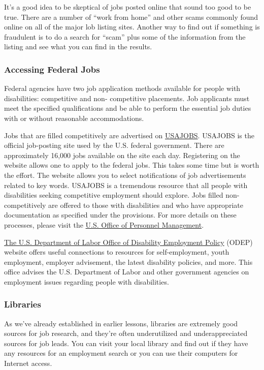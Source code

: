 It's a good idea to be skeptical of jobs posted online that sound too good to be true. There are a number of ``work from home'' and other scams commonly found online on all of the major lob listing sites. Another way to find out if something is fraudulent is to do a search for ``scam'' plus some of the information from the listing and see what you can find in the results.

\subsubsection*{Accessing Federal Jobs}

Federal agencies have two job application methods available for people with disabilities: competitive and non- competitive placements. Job applicants must meet the specified qualifications and be able to perform the essential job duties with or without reasonable accommodations.

Jobs that are filled competitively are advertised on \href{https://www.usajobs.gov/}{USAJOBS}. USAJOBS is the official job-posting site used by the U.S. federal government. There are approximately 16,000 jobs available on the site each day. Registering on the website allows one to apply to the federal jobs. This takes some time but is worth the effort. The website allows you to select notifications of job advertisements related to key words. USAJOBS is a tremendous resource that all people with disabilities seeking competitive employment should explore. Jobs filled non-competitively are offered to those with disabilities and who have appropriate documentation as specified under the provisions. For more details on these processes, please visit the \href{https://www.opm.gov/policy-data-oversight/disability-employment/faqs/?page=6}{U.S. Office of Personnel Management}.

\href{https://www.dol.gov/agencies/odep}{The U.S. Department of Labor Office of Disability Employment Policy} (ODEP) website offers useful connections to resources for self-employment, youth employment, employer advisement, the latest disability policies, and more. This office advises the U.S. Department of Labor and other government agencies on employment issues regarding people with disabilities.

\subsubsection*{Libraries}

As we've already established in earlier lessons, libraries are extremely good sources for job research, and they're often underutilized and underappreciated sources for job leads. You can visit your local library and find out if they have any resources for an employment search or you can use their computers for Internet access.

